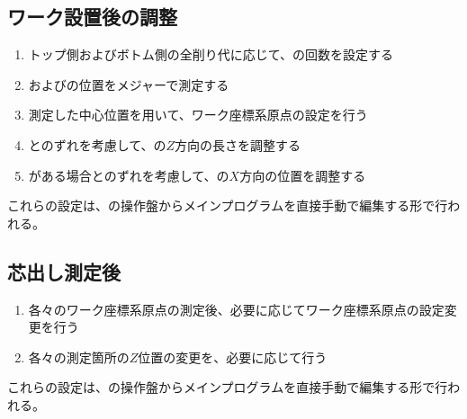 \subsection{ワーク設置後の調整}
\begin{enumerate}[label=\sarrow]
\item トップ側およびボトム側の全削り代に応じて、\nameEndFacecutMilling の回数を設定する
\item \TopODCenter および\BottomODCenter の位置をメジャーで測定する
\item 測定した中心位置を用いて、ワーク座標系原点の設定を行う
\item {}\nameTableCenter とのずれを考慮して、\EndFace の$Z$方向の長さを調整する
\item \CenterlineEndFaceDif がある場合\nameTableCenter とのずれを考慮して、\OutcutCenter の$X$方向の位置を調整する
\end{enumerate}
これらの設定は、\MMC の操作盤からメインプログラムを直接手動で編集する形で行われる。



\clearpage


\subsection{芯出し測定後}
\begin{enumerate}[label=\sarrow]
\item 各々のワーク座標系原点の測定後、必要に応じてワーク座標系原点の設定変更を行う
\item 各々の測定箇所の$Z$位置の変更を、必要に応じて行う
\end{enumerate}
これらの設定は、\MMC の操作盤からメインプログラムを直接手動で編集する形で行われる。



